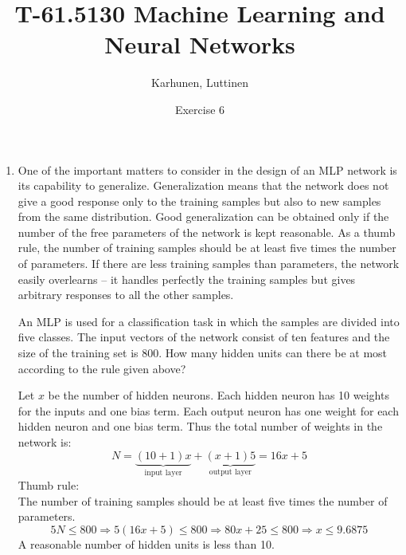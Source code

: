 \title{T-61.5130 Machine Learning and Neural Networks}
\author{Karhunen, Luttinen}
\date{Exercise 6}

\newcommand{\vect}[1]{{\bf{#1}}}
\newcommand{\svect}[1]{\boldsymbol{#1}}
\newcommand{\matr}[1]{\boldsymbol{#1}}
\newcommand{\T}{\mathcal{T}}
\newcommand{\x}{{\bf x}}





\maketitle

\begin{enumerate}

\item One of the important matters to consider in the design of an MLP
  network is its capability to generalize. Generalization means that
  the network does not give a good response only to the training
  samples but also to new samples from the same distribution. Good
  generalization can be obtained only if the number of the free
  parameters of the network is kept reasonable. As a thumb rule, the
  number of training samples should be at least five times the number
  of parameters. If there are less training samples than parameters,
  the network easily overlearns -- it handles perfectly the training
  samples but gives arbitrary responses to all the other samples.

  An MLP is used for a classification task in which the samples are
  divided into five classes. The input vectors of the network consist
  of ten features and the size of the training set is 800. How many
  hidden units can there be at most according to the rule given above?

  \begin{solution}

    Let $x$ be the number of hidden neurons. Each hidden neuron has
    10 weights for the inputs and one bias term. Each output neuron has one
    weight for each hidden neuron and one bias term. Thus the total number
    of weights in the network is:
    \begin{equation*}
      N=\underbrace{(10+1)x}_{\text{input
          layer}}+\underbrace{(x+1)5}_{\text{output layer}}=16x+5
    \end{equation*}
    Thumb rule:\\
    The number of  training samples should be at least five times the
    number of parameters.
    \begin{equation*}
      5N\leq800 \Rightarrow 5(16x+5)\leq 800\Rightarrow 80x+25\leq
      800\Rightarrow x\leq9.6875
    \end{equation*}
    A reasonable number of hidden units is less than 10.
  \end{solution}
  


\end{enumerate}
